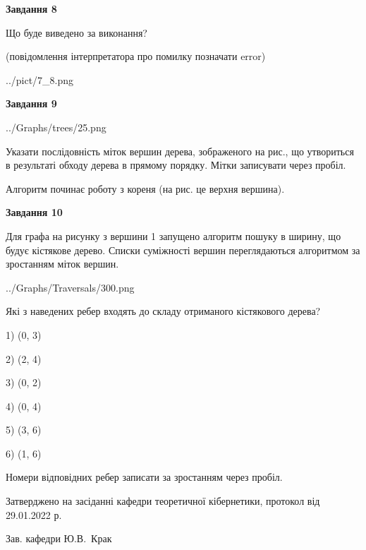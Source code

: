 \documentclass[12pt, ukrainian]{article}
\begin{document}
{\begin {large}
{\begin {center}\textbf{Завдання 8}\end {center}}\par
Що буде виведено за виконання?\par
 (повідомлення інтерпретатора про помилку позначати error)\par
\begin{center}
	{../pict/7_8.png}
\end{center}
\newpage

{\begin {center}\textbf{Завдання 9}\end {center}}\par

\begin{center}
	{../Graphs/trees/25.png}
\end{center}
Указати послідовність міток вершин дерева, зображеного на рис., що утвориться в результаті обходу дерева в прямому порядку. Мітки записувати через пробіл.\par Алгоритм починає роботу з кореня (на рис. це верхня вершина).\par
\newpage

{\begin {center}\textbf{Завдання 10}\end {center}}\par
Для графа на рисунку з вершини 1 запущено алгоритм пошуку в ширину, що будує кістякове дерево. Списки суміжності вершин переглядаються алгоритмом за зростанням міток вершин.\par
\begin{center}
	{../Graphs/Traversals/300.png}
\end{center}
\par Які з наведених ребер входять до складу отриманого кістякового дерева?\par
1) (0, 3)\par
2) (2, 4)\par
3) (0, 2)\par
4) (0, 4)\par
5) (3, 6)\par
6) (1, 6)\par
{\vskip 15pt} Номери відповідних ребер записати за зростанням через пробіл.\par
\newpage


\end {large}
}
{\smallskip \begin {small} Затверджено на засіданні кафедри теоретичної кібернетики, протокол  від   29.01.2022 р.\par\smallskip\smallskip
{\parbox {6.5 cm}{Зав. кафедри \dotfill Ю.В.~Крак}} \end{small}}
\end{document}

